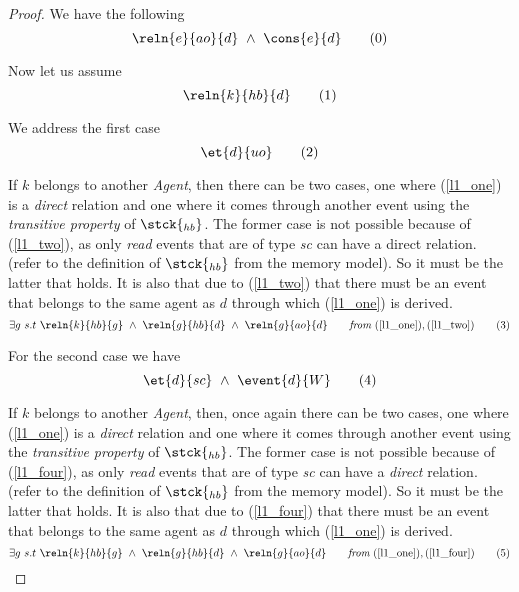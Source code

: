 
    \begin{proof}
        
        We have the following
        \[
            \reln{e}{ao}{d} \ \wedge \ \cons{e}{d} 
            \tag{0}
            \label{l1_zero}
        \]
        
        Now let us assume
        \[
            \reln{k}{hb}{d} 
            \tag{1}
            \label{l1_one}
        \]
        
        We address the first case
        \[
            \et{d}{uo} 
            \tag{2}
            \label{l1_two}
        \]
        
        
        \hspace{15pt} If $k$ belongs to another \textit{Agent}, then there can be two cases, one where (\ref{l1_one}) is a \textit{direct} relation and one where it comes through another event using the \textit{transitive property} of $\stck{_{hb}}$. The former case is not possible because of (\ref{l1_two}), as only \textit{read} events that are of type \textit{sc} can have a direct relation. (refer to the definition of $\stck{_{hb}}$ from the memory model). So it must be the latter that holds. It is also that due to (\ref{l1_two}) that there must be an event that belongs to the same agent as $d$ through which (\ref{l1_one}) is derived.    
        \[
            \exists g \ s.t \ 
            \reln{k}{hb}{g} \ \wedge \ \reln{g}{hb}{d} \ \wedge \ \reln{g}{ao}{d} \qquad
            \textit{from} \
            (\ref{l1_one}), 
            (\ref{l1_two}) 
            \tag{3}
            \label{l1_three}
        \]
        
         For the second case we have 
        \[
            \et{d}{sc} \ \wedge \ \event{d}{W}
            \tag{4}
            \label{l1_four}
        \]

        \hspace{15pt} If $k$ belongs to another \textit{Agent}, then, once again there can be two cases, one where (\ref{l1_one}) is a \textit{direct} relation and one where it comes through another event using the \textit{transitive property} of $\stck{_{hb}}$. The former case is not possible because of (\ref{l1_four}), as only \textit{read} events that are of type \textit{sc} can have a \textit{direct} relation. (refer to the definition of $\stck{_{hb}}$ from the memory model). So it must be the latter that holds. It is also that due to (\ref{l1_four}) that there must be an event that belongs to the same agent as $d$ through which (\ref{l1_one}) is derived.
        \[
            \exists g \ s.t \ 
            \reln{k}{hb}{g} \ \wedge \ \reln{g}{hb}{d} \ \wedge \ \reln{g}{ao}{d} \qquad
            \textit{from} \
            (\ref{l1_one}), 
            (\ref{l1_four}) 
            \tag{5}
            \label{l1_five}
        \]
        

\end{proof}
